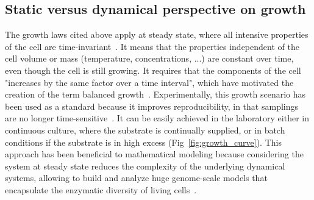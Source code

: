 \subsection{Static versus dynamical perspective on growth}

The growth laws cited above apply at steady state, where all intensive properties of the cell are time-invariant~\cite{schaechter_microbe_2006,fishov_microbial_1995}.
It means that the properties independent of the cell volume or mass (temperature, concentrations, ...) are constant over time, even though the cell is still growing.
It requires that the components of the cell "increases by the same factor over a time interval", which have motivated the creation of the term balanced growth~\cite{campbell_synchronization_1957}.
Experimentally, this growth scenario has been used as a standard because it improves reproducibility, in that samplings are no longer time-sensitive~\cite{schaechter_microbe_2006}.
It can be easily achieved in the laboratory either in continuous culture, where the substrate is continually supplied, or in batch conditions if the substrate is in high excess (Fig~\ref{fig:growth_curve}).
This approach has been beneficial to mathematical modeling because considering the system at steady state reduces the complexity of the underlying dynamical systems, allowing to build and analyze huge genome-scale models that encapsulate the enzymatic diversity of living cells~\cite{orth_what_2010}.

